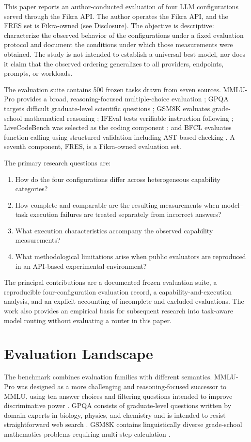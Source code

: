 \documentclass[11pt]{article}
\begin{document}
This paper reports an author-conducted evaluation of four LLM configurations served through the Fikra API. The author operates the Fikra API, and the FRES set is Fikra-owned (see Disclosure). The objective is descriptive: characterize the observed behavior of the configurations under a fixed evaluation protocol and document the conditions under which those measurements were obtained. The study is not intended to establish a universal best model, nor does it claim that the observed ordering generalizes to all providers, endpoints, prompts, or workloads.

The evaluation suite contains 500 frozen tasks drawn from seven sources. MMLU-Pro provides a broad, reasoning-focused multiple-choice evaluation \cite{wang2024mmlupro}; GPQA targets difficult graduate-level scientific questions \cite{rein2023gpqa}; GSM8K evaluates grade-school mathematical reasoning \cite{cobbe2021gsm8k}; IFEval tests verifiable instruction following \cite{zhou2023ifeval}; LiveCodeBench was selected as the coding component \cite{jain2024livecodebench}; and BFCL evaluates function calling using structured validation including AST-based checking \cite{patil2025bfcl}. A seventh component, FRES, is a Fikra-owned evaluation set.

The primary research questions are:
\begin{enumerate}[leftmargin=*]
    \item How do the four configurations differ across heterogeneous capability categories?
    \item How complete and comparable are the resulting measurements when model--task execution failures are treated separately from incorrect answers?
    \item What execution characteristics accompany the observed capability measurements?
    \item What methodological limitations arise when public evaluators are reproduced in an API-based experimental environment?
\end{enumerate}

The principal contributions are a documented frozen evaluation suite, a reproducible four-configuration evaluation record, a capability-and-execution analysis, and an explicit accounting of incomplete and excluded evaluations. The work also provides an empirical basis for subsequent research into task-aware model routing without evaluating a router in this paper.

\section{Evaluation Landscape}
The benchmark combines evaluation families with different semantics. MMLU-Pro was designed as a more challenging and reasoning-focused successor to MMLU, using ten answer choices and filtering questions intended to improve discriminative power \cite{wang2024mmlupro}. GPQA consists of graduate-level questions written by domain experts in biology, physics, and chemistry and is intended to resist straightforward web search \cite{rein2023gpqa}. GSM8K contains linguistically diverse grade-school mathematics problems requiring multi-step calculation \cite{cobbe2021gsm8k}.
\end{document}

